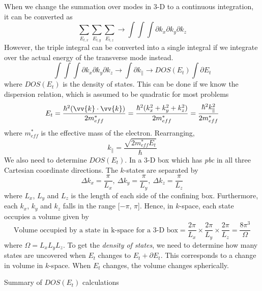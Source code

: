 When we change the summation over modes in 3-D to a continuous integration, it can be converted as \begin{equation}
\sum_{E_{t,x}}\sum_{E_{t,y}}\sum_{E_{t,z}} \rightarrow \int\int\int\partial{}k_{x}\partial{}k_{y}\partial{}k_{z}
\end{equation}However, the triple integral can be converted into a single integral if we integrate over the actual energy of the transverse mode instead. \begin{equation}
\int\int\int\partial{}k_{x}\partial{}k_{y}\partial{}k_{z} \rightarrow \int\partial{}k_{\parallel} \rightarrow DOS(E_{t}) \int\partial{}E_{t}
\end{equation}where $DOS(E_{t})$ is the density of states. This can be done if we know the dispersion relation, which is assumed to be quadratic for most problems \begin{equation}
E_{t} = \frac{\hbar^{2}(\vv{k}\cdot\vv{k})}{2m^{*}_{eff}}=\frac{\hbar^{2}(k^{2}_{x}+k^{2}_{y}+k^{2}_{z})}{2m^{*}_{eff}}=\frac{\hbar^{2}{}k^{2}_{\parallel}}{2m^{*}_{eff}}
\end{equation}where $m^{*}_{eff}$ is the effective mass of the electron. Rearranging, \begin{equation}
k_{\parallel}=\frac{\sqrt{2m^{*}_{eff}E_{t}}}{\hbar} \label{eq:kERel}
\end{equation}We also need to determine $DOS(E_{t})$. In a 3-D box which has \emph{pbc} in all three Cartesian coordinate directions. The $k$-states are separated by \begin{equation}
\Delta{}k_{x}=\frac{\pi}{L_{x}},~\Delta{}k_{y}=\frac{\pi}{L_{y}},~\Delta{}k_{z}=\frac{\pi}{L_{z}}
\end{equation}where $L_{x}$, $L_{y}$ and $L_{z}$ is the length of each side of the confining box. Furthermore, each $k_{x}$, $k_{y}$ and $k_{z}$ falls in the range [$-\pi$, $\pi$]. Hence, in $k$-space, each state occupies a volume given by \begin{equation}
\text{Volume~occupied~by~a~state~in~k-space~for~a~3-D~box}=\frac{2\pi}{L_{x}}\times\frac{2\pi}{L_{y}}\times\frac{2\pi}{L_{z}}=\frac{8\pi^{3}}{\Omega}
\end{equation}where $\Omega=L_{x}L_{y}L_{z}$. To get the \emph{density of states}, we need to determine how many states are uncovered when $E_{t}$ changes to $E_{t}+\partial{}E_{t}$. This corresponds to a change in volume in $k$-space. When $E_{t}$ changes, the volume changes spherically. \begin{table}[!t]
\caption{Summary of $DOS(E_{t})$ calculations}

\end{table}
